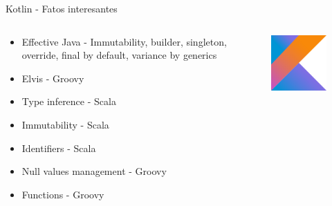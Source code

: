 \documentclass[aspectratio=169]{beamer}
\begin{document}
\begin{frame}{Kotlin - Fatos interesantes}
\begin{columns}
\begin{column}{0.5\textwidth}
	\begin{itemize}
		\item Effective Java - Immutability, builder, singleton, override, final by default, variance by generics
		\item Elvis - Groovy
		\item Type inference - Scala
		\item Immutability - Scala
		\item Identifiers - Scala
		\item Null values management - Groovy
		\item Functions - Groovy
	\end{itemize}
\end{column}
\begin{column}{0.5\textwidth}  %
	\begin{figure}
		\centering
		\includegraphics[width=0.7\linewidth]{Images/kotlin}
	\end{figure}
\end{column}
\end{columns}
\end{frame}
\end{document}
